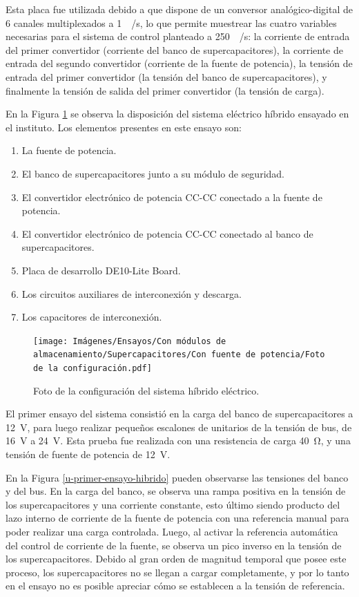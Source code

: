 Esta placa fue utilizada debido a que dispone de un conversor analógico-digital de 6 canales multiplexados a \SI{1}{\mega\sample/\second}, lo que permite muestrear las cuatro variables necesarias para el sistema de control planteado a \SI{250}{\kilo\sample/\second}: la corriente de entrada del primer convertidor (corriente del banco de supercapacitores), la corriente de entrada del segundo convertidor (corriente de la fuente de potencia), la tensión de entrada del primer convertidor (la tensión del banco de supercapacitores), y finalmente la tensión de salida del primer convertidor (la tensión de carga).

En la Figura \ref{foto-ensayo} se observa la disposición del sistema eléctrico híbrido ensayado en el instituto. Los elementos presentes en este ensayo son:

\begin{enumerate}
  \item La fuente de potencia.
  \item El banco de supercapacitores junto a su módulo de seguridad.
  \item El convertidor electrónico de potencia CC-CC conectado a la fuente de potencia.
  \item El convertidor electrónico de potencia CC-CC conectado al banco de supercapacitores.
  \item Placa de desarrollo DE10-Lite Board.
  \item Los circuitos auxiliares de interconexión y descarga.
  \item Los capacitores de interconexión.
\end{enumerate}

\begin{figure}[hbt!]
  \centering
  \texttt{[image: Imágenes/Ensayos/Con módulos de almacenamiento/Supercapacitores/Con fuente de potencia/Foto de la configuración.pdf]}
  \caption{Foto de la configuración del sistema híbrido eléctrico.}
  \label{foto-ensayo}
\end{figure}

El primer ensayo del sistema consistió en la carga del banco de supercapacitores a \SI{12}{\volt}, para luego realizar pequeños escalones de unitarios de la tensión de bus, de \SI{16}{\volt} a \SI{24}{\volt}. Esta prueba fue realizada con una resistencia de carga \SI{40}{\ohm}, y una tensión de fuente de potencia de \SI{12}{\volt}.

En la Figura \ref{u-primer-ensayo-hibrido} pueden observarse las tensiones del banco y del bus. En la carga del banco, se observa una rampa positiva en la tensión de los supercapacitores y una corriente constante, esto último siendo producto del lazo interno de corriente de la fuente de potencia con una referencia manual para poder realizar una carga controlada. Luego, al activar la referencia automática del control de corriente de la fuente, se observa un pico inverso en la tensión de los supercapacitores. Debido al gran orden de magnitud temporal que posee este proceso, los supercapacitores no se llegan a cargar completamente, y por lo tanto en el ensayo no es posible apreciar cómo se establecen a la tensión de referencia. 

